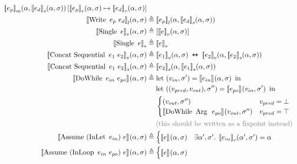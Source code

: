 \begin{align*}
\denotefsub{m}{e_p}{\targ,\denotefs{e_d}{\targ,\tmem}}[\denotefv{e_p}{\targ,\tmem} \mapsto \denotefv{e_d}{\targ,\tmem}]\\
%
\denotefsub{l}{\bop{Write}{e_p}{e_d}}{\targ,\tmem} &\eqdef
\denotefsub{l}{e_p}{\targ,\denotefs{e_d}{\targ,\tmem}}\\
%
\denotefv{\uop{Single}e}{\targ,\tmem} &\eqdef [\denotefv{e}{\targ,\tmem}]\\
\denotestate{\uop{Single}e} &\eqdef \denotestate{e} \\
%
\denotefv{\bop{Concat\ Sequential}{e_1}{e_2}}{\targ,\tmem} &\eqdef
\append{\denotefv{e_1}{\targ,\tmem}}{\denotefv{e_2}{\targ,\denotefs{e_2}{\targ,\tmem}}}\\
%
\denotefs{\bop{Concat\ Sequential}{e_1}{e_2}}{\targ,\tmem} &\eqdef
\denotefs{e_2}{\targ,\denotefs{e_1}{\targ,\tmem}}\\
%
\denotef{\bop{DoWhile}{e_{in}}{e_{po}}}{\targ,\tmem} &\eqdef
\mathrm{let}\ (v_{in},\tmem') = \denotef{e_{in}}{\targ,\tmem}\ \mathrm{in}\\
&\hspace{1.3em}\mathrm{let}\ ((v_{pred}, v_{out}), \tmem'') = \denotef{e_{po}}{v_{in},\tmem'}\ \mathrm{in}\\
&\hspace{1.3em}\begin{cases}
   (v_{out}, \tmem'')
   & v_{pred} = \bot\\
   \denotef{\bop{DoWhile}{\mathrm{Arg}\ }{e_{po}}}{v_{out},\tmem''}
   & v_{pred} = \top\\
\end{cases}\\
&\hspace{1.3em}\text{\color{gray}(this should be written as a fixpoint instead)}\\
\denotef{\bop{Assume}{(\uop{InLet}{e_{in}})}{e}}{\targ,\tmem} &\eqdef
\begin{cases}
  \denotef{e}{\targ,\tmem} & \exists \targ', \tmem' . \; \denotefv{e_{in}}{\targ',\tmem'} = \targ
\end{cases}\\
%
\denotef{\bop{Assume}{(\bop{InLoop}{e_{in}}{e_{po}})}{e}}{\targ,\tmem} &\eqdef
\begin{cases}
  \denotef{e}{\targ,\tmem} &
    \begin{aligned}

\end{aligned}
\end{cases}
\end{align*}
